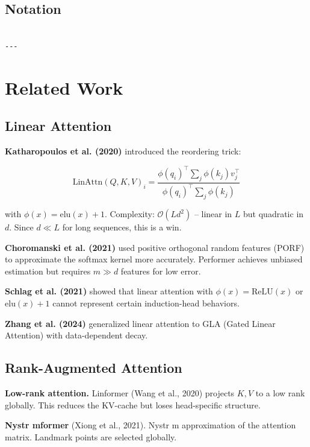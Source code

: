 \subsection{Notation}

\begin{lstlisting}

---
\end{lstlisting}


\section{Related Work}

\subsection{Linear Attention}

\textbf{Katharopoulos et al. (2020)} introduced the reordering trick:

\[
\text{LinAttn}(Q, K, V)_i = \frac{\phi(q_i)^\top \sum_j \phi(k_j) v_j^\top}{\phi(q_i)^\top \sum_j \phi(k_j)}
\tag{2.1}
\]

with $\phi(x) = \mathrm{elu}(x) + 1$. Complexity: $\mathcal{O}(L d^2)$ -- 
linear in $L$ but quadratic in $d$. Since $d \ll L$ for long sequences, 
this is a win.

\textbf{Choromanski et al. (2021)} used positive orthogonal random features 
(PORF) to approximate the softmax kernel more accurately. Performer achieves 
unbiased estimation but requires $m \gg d$ features for low error.

\textbf{Schlag et al. (2021)} showed that linear attention with $\phi(x) = 
\mathrm{ReLU}(x)$ or $\mathrm{elu}(x) + 1$ cannot represent certain 
induction-head behaviors.

\textbf{Zhang et al. (2024)} generalized linear attention to GLA (Gated Linear 
Attention) with data-dependent decay.

\subsection{Rank-Augmented Attention}

\textbf{Low-rank attention.} Linformer (Wang et al., 2020) projects $K, V$ to a 
low rank globally. This reduces the KV-cache but loses head-specific 
structure.

\textbf{Nystr mformer} (Xiong et al., 2021). Nystr m approximation of the attention 
matrix. Landmark points are selected globally.

